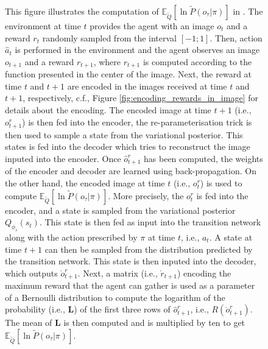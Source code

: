 \documentclass[twoside,11pt]{article}
\let\oldmathcal\mathcal
\renewcommand{\mathcal}[1]{%
  \IfSubStr{ABCDEFGHIJKLMNOPQRSTUVWXYZ}{#1}{\oldmathcal{#1}}{\mathdutchcal{#1}}
}
\begin{document}
\begin{figure}
\begin{center}
	\end{center}
  \caption{This figure illustrates the computation of $\mathbb{E}_{\tilde{Q}}[\ln \tilde{P}(o_\tau|\pi)]$ in \citet{DeepAIwithMCMC}. The environment at time $t$ provides the agent with an image $o_t$ and a reward $r_t$ randomly sampled from the interval $[-1;1]$. Then, action $\hat{a}_t$ is performed in the environment and the agent observes an image $o_{t+1}$ and a reward $r_{t+1}$, where $r_{t+1}$ is computed according to the function presented in the center of the image. Next, the reward at time $t$ and $t+1$ are encoded in the images received at time $t$ and $t+1$, respectively, c.f., Figure \ref{fig:encoding_rewards_in_image} for details about the encoding. The encoded image at time $t+1$ (i.e., $o^r_{t+1}$) is then fed into the encoder, the re-parameterisation trick is then used to sample a state from the variational posterior. This states is fed into the decoder which tries to reconstruct the image inputed into the encoder. Once $\hat{o}^r_{t+1}$ has been computed, the weights of the encoder and decoder are learned using back-propagation. On the other hand, the encoded image at time $t$ (i.e., $o^r_t$) is used to compute $\mathbb{E}_{\tilde{Q}}[\ln \tilde{P}(o_\tau|\pi)]$. More precisely, the $o^r_t$ is fed into the encoder, and a state is sampled from the variational posterior $Q_{\phi_s}(s_t)$. This state is then fed as input into the transition network along with the action prescribed by $\pi$ at time $t$, i.e., $a_t$. A state at time $t+1$ can then be sampled from the distribution predicted by the transition network. This state is then inputed into the decoder, which outputs $\mathring{o}^r_{t+1}$. Next, a matrix (i.e., $\mathring{r}_{t+1}$) encoding the maximum reward that the agent can gather is used as a parameter of a Bernoulli distribution to compute the logarithm of the probability (i.e., $\bm{L}$) of the first three rows of $\hat{o}^r_{t+1}$, i.e., $R(\mathring{o}^r_{t+1})$. The mean of $\bm{L}$ is then computed and is multiplied by ten to get $\mathbb{E}_{\tilde{Q}}[\ln \tilde{P}(o_\tau|\pi)]$.}
   \label{fig:computation_of_extrinsic_value}
\end{figure}
\end{document}
